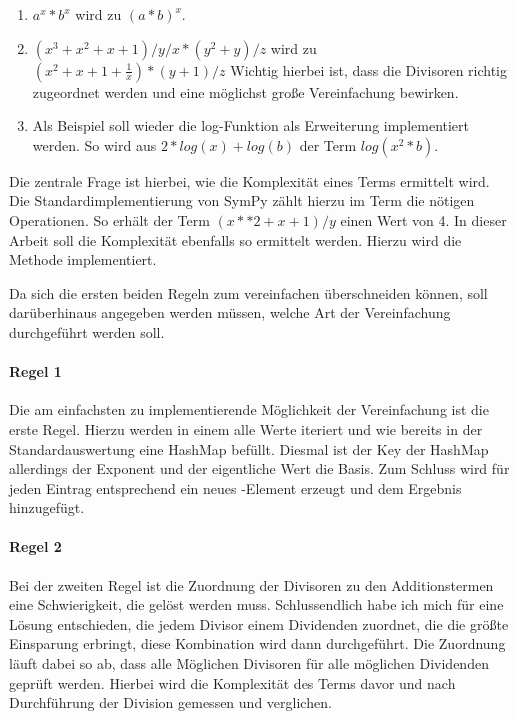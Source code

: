 \documentclass[11pt,a4paper, ngerman]{article}
\begin{document}
\begin{enumerate}
    \item $a^x * b^x$ wird zu $(a*b)^x$.
    \item $(x^3+x^2+x+1)/y/x*(y^2+y)/z$ wird zu $(x^2+x+1+\frac{1}{x})*(y+1)/z$ Wichtig hierbei ist, dass die Divisoren richtig zugeordnet werden und eine möglichst große Vereinfachung bewirken.
    \item Als Beispiel soll wieder die log-Funktion als Erweiterung implementiert werden. So wird aus $2*log(x)+log(b)$ der Term $log(x^2*b)$.
\end{enumerate}

Die zentrale Frage ist hierbei, wie die Komplexität eines Terms ermittelt wird. Die Standardimplementierung von SymPy zählt hierzu im Term die nötigen Operationen. So erhält der Term $(x**2+x+1)/y$ einen Wert von 4. In dieser Arbeit soll die Komplexität ebenfalls so ermittelt werden. Hierzu wird die Methode  implementiert.

Da sich die ersten beiden Regeln zum vereinfachen überschneiden können, soll darüberhinaus angegeben werden müssen, welche Art der Vereinfachung durchgeführt werden soll.

\paragraph{Regel 1} Die am einfachsten zu implementierende Möglichkeit der Vereinfachung ist die erste Regel. Hierzu werden in einem  alle Werte iteriert und wie bereits in der Standardauswertung eine HashMap befüllt. Diesmal ist der Key der HashMap allerdings der Exponent und der eigentliche Wert die Basis. Zum Schluss wird für jeden Eintrag entsprechend ein neues -Element erzeugt und dem Ergebnis hinzugefügt.

\paragraph{Regel 2} Bei der zweiten Regel ist die Zuordnung der Divisoren zu den Additionstermen eine Schwierigkeit, die gelöst werden muss. Schlussendlich habe ich mich für eine Lösung entschieden, die jedem Divisor einem Dividenden zuordnet, die die größte Einsparung erbringt, diese Kombination wird dann durchgeführt. Die Zuordnung läuft dabei so ab, dass alle Möglichen Divisoren für alle möglichen Dividenden geprüft werden. Hierbei wird die Komplexität des Terms davor und nach Durchführung der Division gemessen und verglichen.
\end{document}

